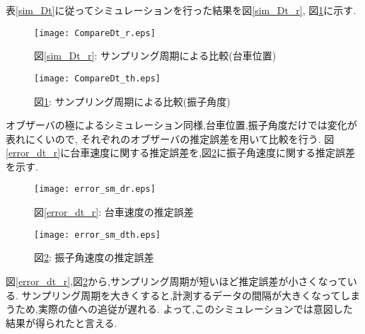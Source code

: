 表\ref{sim_Dt}に従ってシミュレーションを行った結果を図\ref{sim_Dt_r}, 図\ref{sim_Dt_th}に示す.

\begin{figure}[htbp]
    \begin{minipage}{0.5\hsize}
        \begin{center}
            \texttt{[image: CompareDt\_r.eps]}
            \caption{図\ref{sim_Dt_r}: サンプリング周期による比較(台車位置)}
            \label{sim_Dt_r}
        \end{center}
    \end{minipage}
    \begin{minipage}{0.5\hsize}
        \begin{center}
            \texttt{[image: CompareDt\_th.eps]}
            \caption{図\ref{sim_Dt_th}: サンプリング周期による比較(振子角度)}
            \label{sim_Dt_th}
        \end{center}
    \end{minipage}
\end{figure}

オブザーバの極によるシミュレーション同様,台車位置,振子角度だけでは変化が表れにくいので,
それぞれのオブザーバの推定誤差を用いて比較を行う.
図\ref{error_dt_r}に台車速度に関する推定誤差を,図\ref{error_dt_th}に振子角速度に関する推定誤差を示す.

\begin{figure}[htbp]
    \begin{minipage}{0.5\hsize}
        \begin{center}
            \texttt{[image: error\_sm\_dr.eps]}
            \caption{図\ref{error_dt_r}: 台車速度の推定誤差}
            \label{error_dt_r}
        \end{center}
    \end{minipage}
    \begin{minipage}{0.5\hsize}
        \begin{center}
            \texttt{[image: error\_sm\_dth.eps]}
            \caption{図\ref{error_dt_th}: 振子角速度の推定誤差}
            \label{error_dt_th}
        \end{center}
    \end{minipage}
\end{figure}

図\ref{error_dt_r},図\ref{error_dt_th}から,サンプリング周期が短いほど推定誤差が小さくなっている.
サンプリング周期を大きくすると,計測するデータの間隔が大きくなってしまうため,実際の値への追従が遅れる.
よって,このシミュレーションでは意図した結果が得られたと言える.



